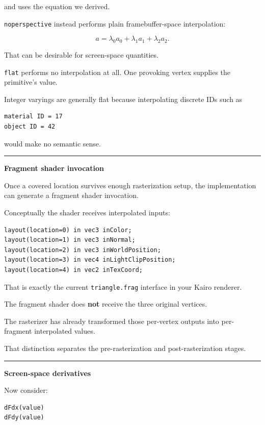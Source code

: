 and uses the equation we derived.

\texttt{noperspective} instead performs plain framebuffer-space interpolation:

\[
a=
\lambda_0a_0+
\lambda_1a_1+
\lambda_2a_2.
\]

That can be desirable for screen-space quantities.

\texttt{flat} performs no interpolation at all. One provoking vertex supplies the primitive's value.

Integer varyings are generally flat because interpolating discrete IDs such as

\begin{verbatim}
material ID = 17
object ID = 42
\end{verbatim}

would make no semantic sense.

\begin{center}\rule{0.5\linewidth}{0.5pt}\end{center}

\textbf{Fragment shader invocation}

Once a covered location survives enough rasterization setup, the implementation can generate a fragment shader invocation.

Conceptually the shader receives interpolated inputs:

\begin{verbatim}
layout(location=0) in vec3 inColor;
layout(location=1) in vec3 inNormal;
layout(location=2) in vec3 inWorldPosition;
layout(location=3) in vec4 inLightClipPosition;
layout(location=4) in vec2 inTexCoord;
\end{verbatim}

That is exactly the current \texttt{triangle.frag} interface in your Kairo renderer.

The fragment shader does \textbf{not} receive the three original vertices.

The rasterizer has already transformed those per-vertex outputs into per-fragment interpolated values.

That distinction separates the pre-rasterization and post-rasterization stages.

\begin{center}\rule{0.5\linewidth}{0.5pt}\end{center}

\textbf{Screen-space derivatives}

Now consider:

\begin{verbatim}
dFdx(value)
dFdy(value)
\end{verbatim}

